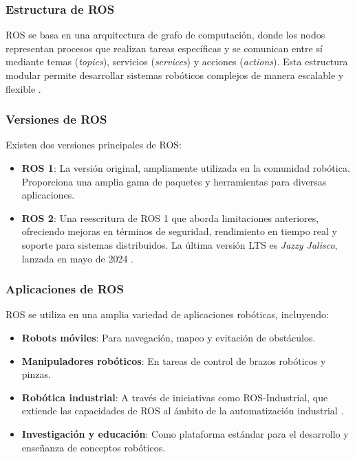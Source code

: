 \subsubsection*{Estructura de ROS}

ROS se basa en una arquitectura de grafo de computación, donde los nodos representan procesos que realizan tareas específicas y se comunican entre sí mediante temas (\textit{topics}), servicios (\textit{services}) y acciones (\textit{actions}). Esta estructura modular permite desarrollar sistemas robóticos complejos de manera escalable y flexible \cite{ros_wiki_concepts}.

\subsubsection*{Versiones de ROS}

Existen dos versiones principales de ROS:

\begin{itemize}
	\item \textbf{ROS 1}: La versión original, ampliamente utilizada en la comunidad robótica. Proporciona una amplia gama de paquetes y herramientas para diversas aplicaciones.
	\item \textbf{ROS 2}: Una reescritura de ROS 1 que aborda limitaciones anteriores, ofreciendo mejoras en términos de seguridad, rendimiento en tiempo real y soporte para sistemas distribuidos. La última versión LTS es \textit{Jazzy Jalisco}, lanzada en mayo de 2024 \cite{ros_home}.
\end{itemize}

\subsubsection{Aplicaciones de ROS}

ROS se utiliza en una amplia variedad de aplicaciones robóticas, incluyendo:

\begin{itemize}
	\item \textbf{Robots móviles}: Para navegación, mapeo y evitación de obstáculos.
	\item \textbf{Manipuladores robóticos}: En tareas de control de brazos robóticos y pinzas.
	\item \textbf{Robótica industrial}: A través de iniciativas como ROS-Industrial, que extiende las capacidades de ROS al ámbito de la automatización industrial \cite{ros_industrial}.
	\item \textbf{Investigación y educación}: Como plataforma estándar para el desarrollo y enseñanza de conceptos robóticos.
\end{itemize}

